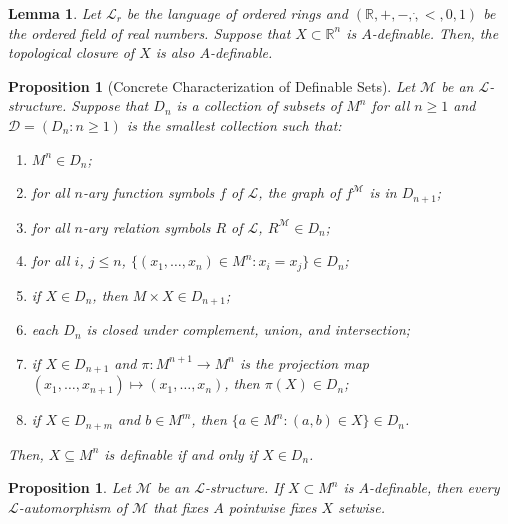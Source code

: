 \documentclass{amsart}
\newtheorem{lemma}[theorem]{Lemma}
\newtheorem{proposition}[theorem]{Proposition}
\theoremstyle{definition}
\numberwithin{equation}{section}
\begin{document}
\begin{lemma}
    Let $\mathcal{L}_r$ be the language of ordered rings and
    $(\mathbb{R}, +, -, \dot, <, 0, 1)$ be the ordered field of real numbers.
    Suppose that $X \subset \mathbb{R}^n$ is $A$-definable.
    Then, the topological closure of $X$ is also $A$-definable.
\end{lemma}

\begin{proposition}[Concrete Characterization of Definable Sets]
    Let $\mathcal{M}$ be an $\mathcal{L}$-structure.
    Suppose that $D_n$ is a collection of subsets of $M^n$ for all $n \ge 1$ and
    $\mathcal{D} = (D_n : n \ge 1)$ is the smallest collection such that:
    \begin{enumerate}[label = {\roman*)}]
        \item $M^n \in D_n$;
        \item for all $n$-ary function symbols $f$ of $\mathcal{L}$, the graph of $f^{\mathcal{M}}$ is in $D_{n+1}$;
        \item for all $n$-ary relation symbols $R$ of $\mathcal{L}$, $R^{\mathcal{M}} \in D_n$;
        \item for all $i$, $j\le n$, $\{(x_1,\dots,x_n)\in M^n : x_i = x_j\} \in D_n$;
        \item if $X \in D_n$, then $M \times X \in D_{n+1}$;
        \item each $D_n$ is closed under complement, union, and intersection;
        \item if $X \in D_{n+1}$ and $\pi: M^{n+1} \to M^n$ is the projection map $(x_1,\dots,x_{n+1}) \mapsto (x_1,\dots,x_n)$,
          then $\pi(X) \in D_n$;
        \item if $X \in D_{n+m}$ and $b \in M^m$, then $\{a\in M^n: (a,b) \in X \} \in D_n$.
    \end{enumerate}
    Then, $X \subseteq M^n$ is definable if and only if $X \in D_n$.
\end{proposition}

\begin{proposition}
    Let $\mathcal{M}$ be an $\mathcal{L}$-structure.
    If $X \subset M^n$ is $A$-definable,
    then every $\mathcal{L}$-automorphism of $\mathcal{M}$ that fixes $A$ pointwise fixes $X$ setwise.
\end{proposition}
\end{document}
